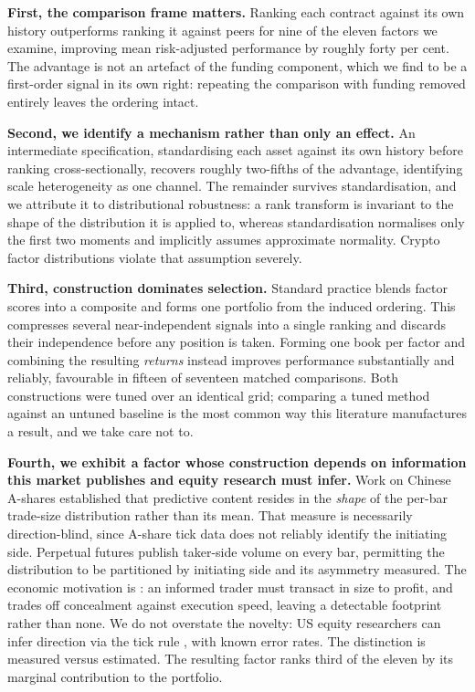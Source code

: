 \documentclass[11pt,letterpaper]{article}
\begin{document}
\textbf{First, the comparison frame matters.} Ranking each contract against its
own history outperforms ranking it against peers for nine of the eleven factors
we examine, improving mean risk-adjusted performance by roughly forty per cent.
The advantage is not an artefact of the funding component, which we find to be a
first-order signal in its own right: repeating the comparison with funding
removed entirely leaves the ordering intact.

\textbf{Second, we identify a mechanism rather than only an effect.} An
intermediate specification, standardising each asset against its own history
before ranking cross-sectionally, recovers roughly two-fifths of the advantage,
identifying scale heterogeneity as one channel. The remainder survives
standardisation, and we attribute it to distributional robustness: a rank
transform is invariant to the shape of the distribution it is applied to, whereas
standardisation normalises only the first two moments and implicitly assumes
approximate normality. Crypto factor distributions violate that assumption
severely.

\textbf{Third, construction dominates selection.} Standard practice blends factor
scores into a composite and forms one portfolio from the induced ordering. This
compresses several near-independent signals into a single ranking and discards
their independence before any position is taken. Forming one book per factor and
combining the resulting \emph{returns} instead improves performance substantially
and reliably, favourable in fifteen of seventeen matched comparisons. Both
constructions were tuned over an identical grid; comparing a tuned method against
an untuned baseline is the most common way this literature manufactures a result,
and we take care not to.

\textbf{Fourth, we exhibit a factor whose construction depends on information
this market publishes and equity research must infer.} Work on Chinese A-shares
established that predictive content resides in the \emph{shape} of the per-bar
trade-size distribution rather than its mean. That measure is necessarily
direction-blind, since A-share tick data does not reliably identify the
initiating side. Perpetual futures publish taker-side volume on every bar,
permitting the distribution to be partitioned by initiating side and its
asymmetry measured. The economic motivation is \citet{kyle1985}: an informed
trader must transact in size to profit, and trades off concealment against
execution speed, leaving a detectable footprint rather than none. We do not
overstate the novelty: US equity researchers can
infer direction via the tick rule \citep{leeready1991}, with known error rates.
The distinction is measured versus estimated. The resulting factor ranks third of
the eleven by its marginal contribution to the portfolio.
\end{document}

